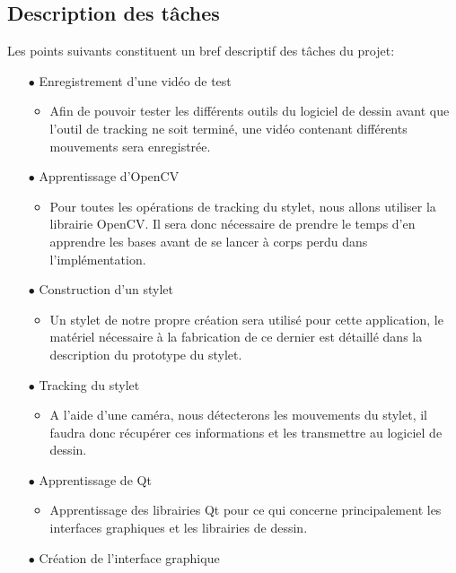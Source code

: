 \documentclass[11pt,a4paper,oldfontcommands]{memoir}
\begin{document}
\subsection{Description des tâches}

Les points suivants constituent un bref descriptif des tâches du projet:

\begin{itemize}
\item[$\bullet$] Enregistrement d'une vidéo de test
    \begin{itemize}
	\item Afin de pouvoir tester les différents outils du logiciel de dessin avant que l'outil de tracking ne soit terminé, une vidéo contenant différents mouvements sera enregistrée.
	\end{itemize}
\item[$\bullet$] Apprentissage d'OpenCV
    \begin{itemize}
	\item Pour toutes les opérations de tracking du stylet, nous allons utiliser la librairie OpenCV. Il sera donc nécessaire de prendre le temps d’en apprendre les bases avant de se lancer à corps perdu dans l’implémentation.
	\end{itemize}
\item[$\bullet$] Construction d'un stylet
    \begin{itemize}
	\item Un stylet de notre propre création sera utilisé pour cette application, le matériel nécessaire à la fabrication de ce dernier est détaillé dans la description du prototype du stylet.
	\end{itemize}
\item[$\bullet$] Tracking du stylet
    \begin{itemize}
	\item A l’aide d’une caméra, nous détecterons les mouvements du stylet, il faudra donc récupérer ces informations et les transmettre au logiciel de dessin.
	\end{itemize}
\item[$\bullet$] Apprentissage de Qt
    \begin{itemize}
	\item Apprentissage des librairies Qt pour ce qui concerne principalement les interfaces graphiques et les librairies de dessin.
	\end{itemize}
\item[$\bullet$] Création de l’interface graphique
    \begin{itemize}

\end{itemize}
\end{itemize}
\end{document}
